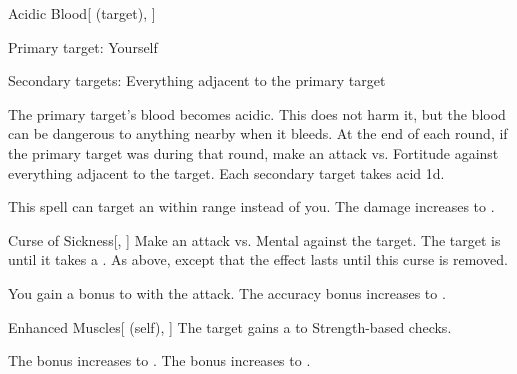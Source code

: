 \lowercase{\hypertarget{spell:Acidic Blood}{}}\label{spell:Acidic Blood}
\begin{attuneability}[Rank 3]{\hypertarget{spell:Acidic Blood}{Acidic Blood}}[ (target), ]

Primary target: Yourself
\par\noindent
Secondary targets: Everything adjacent to the primary target

The primary target's blood becomes acidic.
This does not harm it, but the blood can be dangerous to anything nearby when it bleeds.
At the end of each round, if the primary target was  during that round, make an attack vs. Fortitude against everything adjacent to the target.
\hit Each secondary target takes acid  \minus1d.

\rankline
{} This spell can target an  within \rngmed range instead of you.
 The damage increases to .

\end{attuneability}
\vspace{0.25em}



\lowercase{\hypertarget{spell:Curse of Sickness}{}}\label{spell:Curse of Sickness}
\begin{freeability}[Rank 3]{\hypertarget{spell:Curse of Sickness}{Curse of Sickness}}[, ]
Make an attack vs. Mental against the target.
\hit The target is  until it takes a .
\crit As above, except that the effect lasts until this curse is removed.

\rankline
{} You gain a  bonus to  with the attack.
 The accuracy bonus increases to .

\end{freeability}
\vspace{0.25em}



\lowercase{\hypertarget{spell:Enhanced Muscles}{}}\label{spell:Enhanced Muscles}
\begin{attuneability}[Rank 3]{\hypertarget{spell:Enhanced Muscles}{Enhanced Muscles}}[ (self), ]
The target gains a   to Strength-based checks.

\rankline
{} The bonus increases to .
 The bonus increases to .

\end{attuneability}
\vspace{0.25em}



